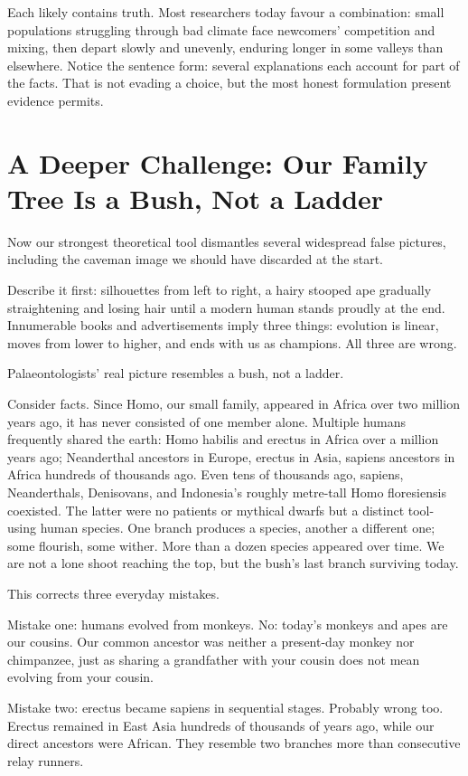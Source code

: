 Each likely contains truth. Most researchers today favour a combination: small populations struggling through bad climate face newcomers' competition and mixing, then depart slowly and unevenly, enduring longer in some valleys than elsewhere. Notice the sentence form: several explanations each account for part of the facts. That is not evading a choice, but the most honest formulation present evidence permits.

\section[Further Challenge: Bush, Not Ladder]{A Deeper Challenge: Our Family Tree Is a Bush, Not a Ladder}
Now our strongest theoretical tool dismantles several widespread false pictures, including the caveman image we should have discarded at the start.

Describe it first: silhouettes from left to right, a hairy stooped ape gradually straightening and losing hair until a modern human stands proudly at the end. Innumerable books and advertisements imply three things: evolution is linear, moves from lower to higher, and ends with us as champions. All three are wrong.

Palaeontologists' real picture resembles a bush, not a ladder.

Consider facts. Since Homo, our small family, appeared in Africa over two million years ago, it has never consisted of one member alone. Multiple humans frequently shared the earth: Homo habilis and erectus in Africa over a million years ago; Neanderthal ancestors in Europe, erectus in Asia, sapiens ancestors in Africa hundreds of thousands ago. Even tens of thousands ago, sapiens, Neanderthals, Denisovans, and Indonesia's roughly metre-tall Homo floresiensis coexisted. The latter were no patients or mythical dwarfs but a distinct tool-using human species. One branch produces a species, another a different one; some flourish, some wither. More than a dozen species appeared over time. We are not a lone shoot reaching the top, but the bush's last branch surviving today.

This corrects three everyday mistakes.

Mistake one: humans evolved from monkeys. No: today's monkeys and apes are our cousins. Our common ancestor was neither a present-day monkey nor chimpanzee, just as sharing a grandfather with your cousin does not mean evolving from your cousin.

Mistake two: erectus became sapiens in sequential stages. Probably wrong too. Erectus remained in East Asia hundreds of thousands of years ago, while our direct ancestors were African. They resemble two branches more than consecutive relay runners.

